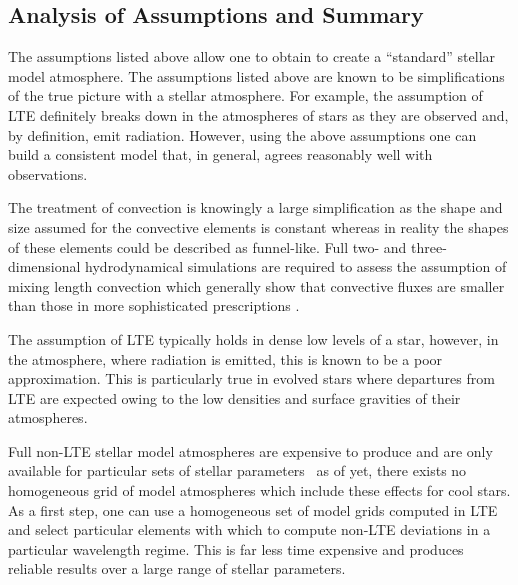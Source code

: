 



\subsection{Analysis of Assumptions and Summary} %
\label{sub:assumptions_summary}

The assumptions listed above allow one to obtain to create a ``standard'' stellar model atmosphere.
The assumptions listed above are known to be simplifications of the true picture with a stellar atmosphere.
For example, the assumption of LTE definitely breaks down in the atmospheres of stars as they are observed and, by definition, emit radiation.
However, using the above assumptions one can build a consistent model that, in general, agrees reasonably well with observations.

The treatment of convection is knowingly a large simplification as the shape and size assumed for the convective elements is constant whereas in reality the shapes of these elements could be described as funnel-like.
Full two- and three-dimensional hydrodynamical simulations are required to assess the assumption of mixing length convection which generally show that convective fluxes are smaller than those in more sophisticated prescriptions
\citep{2012sse..book.....K}.

The assumption of LTE typically holds in dense low levels of a star, however, in the atmosphere, where radiation is emitted, this is known to be a poor approximation.
This is particularly true in evolved stars where departures from LTE are expected owing to the low densities and surface gravities of their atmospheres.

Full non-LTE stellar model atmospheres are expensive to produce and are only available for particular sets of stellar parameters~\citep[e.g. {\sc tlusty} for stars with \Teff~$<$~27\,500;][]{2003ApJS..146..417L}
as of yet, there exists no homogeneous grid of model atmospheres which include these effects for cool stars.
As a first step, one can use a homogeneous set of model grids computed in LTE and select particular elements with which to compute non-LTE deviations in a particular wavelength regime.
This is far less time expensive and produces reliable results over a large range of stellar parameters.


